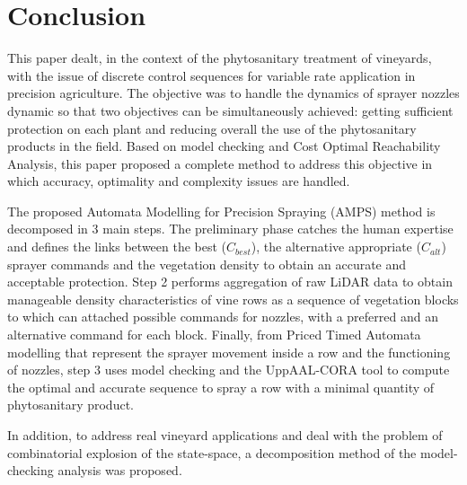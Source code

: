 \documentclass[preprint,3p,times,twocolumn]{elsarticle}
\begin{document}
\section{Conclusion} 

This paper dealt, in the context of the phytosanitary treatment of vineyards, with the issue of discrete control sequences for variable rate application in precision agriculture. The objective was to handle the dynamics of sprayer nozzles dynamic so that two objectives can be simultaneously achieved: getting sufficient protection on each plant and reducing overall the use of the phytosanitary products in the field. Based on model checking and Cost Optimal Reachability Analysis, this paper proposed a complete method to address this objective in which accuracy, optimality and complexity issues are handled.

The proposed Automata Modelling for Precision Spraying (AMPS) method is decomposed in 3 main steps. The preliminary phase catches the human expertise and defines the links between the best ($C_{best}$), the alternative appropriate ($C_{alt}$) sprayer commands and the vegetation density to obtain an accurate and acceptable protection. Step 2 performs aggregation of raw LiDAR data to obtain manageable density characteristics of vine rows as a sequence of vegetation blocks to which can attached  possible commands for nozzles, with a preferred and an alternative command for each block. Finally, from Priced Timed Automata modelling that represent the sprayer movement inside a row and the functioning of nozzles, step 3 uses model checking and the UppAAL-CORA tool to compute the optimal and accurate sequence to spray a row with a minimal quantity of phytosanitary product.

In addition, to address real vineyard applications and deal with the problem of combinatorial explosion of the state-space, a decomposition method of the model-checking analysis was proposed. 
\end{document}
